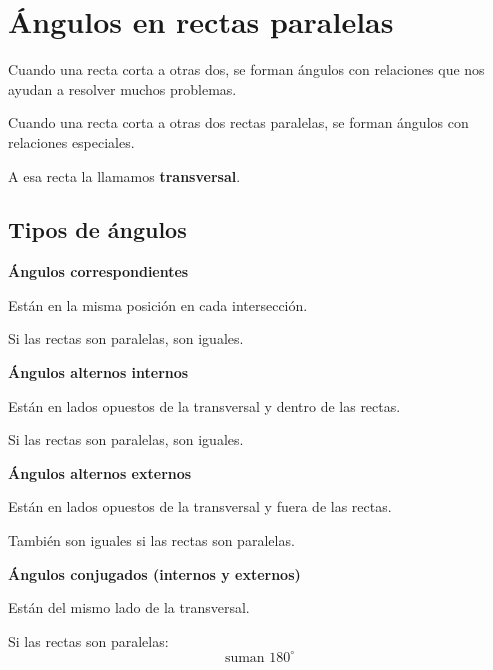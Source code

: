 \documentclass[12pt]{article}
\newcommand{\observa}[1]{%
    \begin{tcolorbox}[colback=amarilloSuave, colframe=naranjaEureka, title=Observa y piensa]
    #1
    \end{tcolorbox}
}
\begin{document}
    \section{Ángulos en rectas paralelas}
    Cuando una recta corta a otras dos, se forman ángulos con relaciones que nos ayudan a resolver muchos problemas.

    \begin{idea}
        Cuando una recta corta a otras dos rectas paralelas, se forman ángulos con relaciones especiales.
    \end{idea}

    A esa recta la llamamos \textbf{transversal}.

    \subsection*{Tipos de ángulos}
    \textbf{Ángulos correspondientes}

    \begin{idea}
        Están en la misma posición en cada intersección.
    \end{idea}

    \observa{Si las rectas son paralelas, son iguales.}

    \textbf{Ángulos alternos internos}

    \begin{idea}
        Están en lados opuestos de la transversal y dentro de las rectas.
    \end{idea}

    \observa{Si las rectas son paralelas, son iguales.}

    \textbf{Ángulos alternos externos}

    \begin{idea}
        Están en lados opuestos de la transversal y fuera de las rectas.
    \end{idea}

    \observa{También son iguales si las rectas son paralelas.}

    \textbf{Ángulos conjugados (internos y externos)}

    \begin{idea}
        Están del mismo lado de la transversal.
    \end{idea}

    \observa{Si las rectas son paralelas:
        \[
        \text{suman } 180^\circ
        \]}
\end{document}

